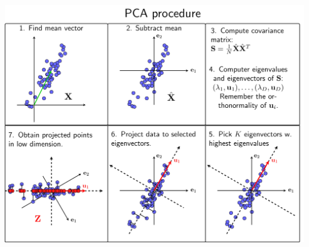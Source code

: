 \documentclass{article}
\begin{document}
\centerline{\includegraphics[scale=0.08]{img7}}
\end{document}
